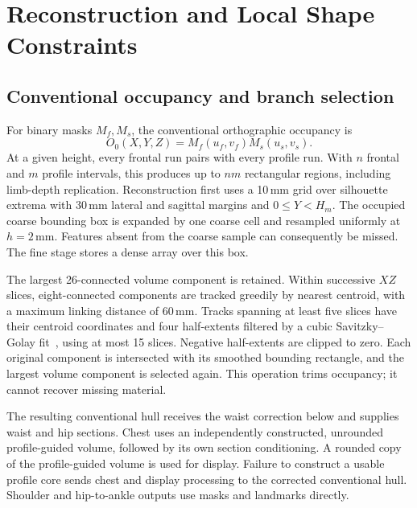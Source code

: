 \documentclass[11pt,a4paper]{article}
\begin{document}
\section{Reconstruction and Local Shape Constraints}
\subsection{Conventional occupancy and branch selection}
For binary masks $M_f,M_s$, the conventional orthographic occupancy is
\begin{equation}
 O_0(X,Y,Z)=M_f(u_f,v_f)M_s(u_s,v_s).
 \label{eq:hull}
\end{equation}
At a given height, every frontal run pairs with every profile run. With $n$ frontal and $m$ profile intervals, this produces up to $nm$ rectangular regions, including limb-depth replication. Reconstruction first uses a 10\,mm grid over silhouette extrema with 30\,mm lateral and sagittal margins and $0\leq Y<H_m$. The occupied coarse bounding box is expanded by one coarse cell and resampled uniformly at $h=2$\,mm. Features absent from the coarse sample can consequently be missed. The fine stage stores a dense array over this box.

The largest 26-connected volume component is retained. Within successive $XZ$ slices, eight-connected components are tracked greedily by nearest centroid, with a maximum linking distance of 60\,mm. Tracks spanning at least five slices have their centroid coordinates and four half-extents filtered by a cubic Savitzky--Golay fit~\cite{savitzky1964smoothing}, using at most 15 slices. Negative half-extents are clipped to zero. Each original component is intersected with its smoothed bounding rectangle, and the largest volume component is selected again. This operation trims occupancy; it cannot recover missing material.

The resulting conventional hull receives the waist correction below and supplies waist and hip sections. Chest uses an independently constructed, unrounded profile-guided volume, followed by its own section conditioning. A rounded copy of the profile-guided volume is used for display. Failure to construct a usable profile core sends chest and display processing to the corrected conventional hull. Shoulder and hip-to-ankle outputs use masks and landmarks directly.
\end{document}
